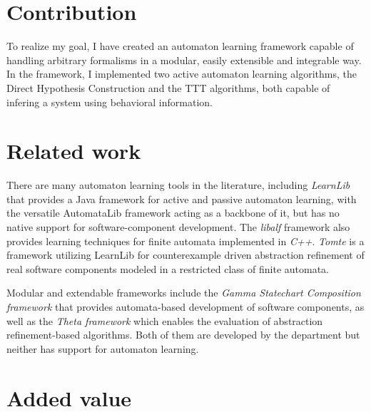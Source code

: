 \section{Contribution}

To realize my goal, I have created an automaton learning framework capable of handling arbitrary formalisms in a modular, easily extensible and integrable way. In the framework, I implemented two active automaton learning algorithms, the Direct Hypothesis Construction\cite{10.1007/978-3-642-34781-8_19} and the TTT\cite{10.1007/978-3-319-11164-3_26} algorithms, both capable of infering a system using behavioral information.

\section{Related work}



There are many automaton learning tools in the literature, including
\emph{LearnLib}\cite{10.1007/978-3-319-21690-4_32} that provides a Java framework for active and passive automaton learning, with the versatile AutomataLib framework acting as a backbone of it, but has no native support for software-component development. The \emph{libalf} framework also provides learning techniques for finite automata implemented in \emph{C++}. \emph{Tomte}\cite{aarts2012automata} is a framework utilizing LearnLib for counterexample driven abstraction refinement of real software components modeled in a restricted class of finite automata. 

Modular and extendable frameworks include the \emph{Gamma Statechart Composition framework}\cite{DBLP:conf/icse/MolnarGVMV18} that provides automata-based development of software components, as well as the \emph{Theta framework}\cite{theta-fmcad2017} which enables the evaluation of abstraction refinement-based algorithms. Both of them are developed by the department but neither has support for automaton learning.

\section{Added value}

